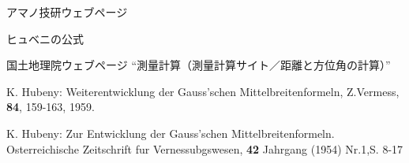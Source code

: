 \documentclass[11pt]{jarticle}
\begin{document}
\begin{thebibliography}{4}

アマノ技研ウェブページ

ヒュベニの公式

国土地理院ウェブページ ``測量計算（測量計算サイト／距離と方位角の計算）''

K. Hubeny: 
\newblock Weiterentwicklung der Gauss'schen Mittelbreitenformeln, Z.Vermess, {\bf 84}, 159-163, 1959.

K. Hubeny: 
\newblock
Zur Entwicklung der Gauss'schen Mittelbreitenformeln. Osterreichische Zeitschrift fur Vernessubgswesen, {\bf 42} Jahrgang (1954) Nr.1,S. 8-17

\end{thebibliography}
\end{document}
